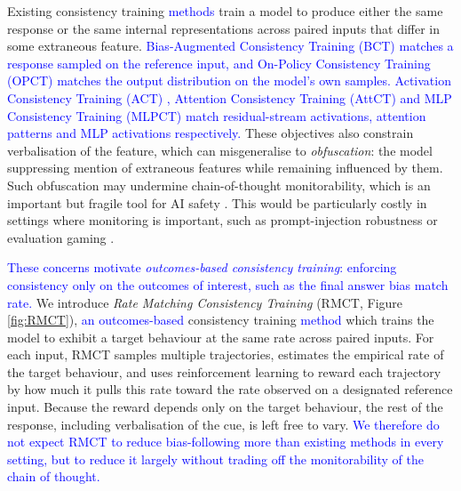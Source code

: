 \documentclass{article}
\begin{document}
Existing consistency training \textcolor{blue}{methods} train a model to produce either the same response or the same internal representations across paired inputs that differ in some extraneous feature. \textcolor{blue}{Bias-Augmented Consistency Training (BCT) \citep{chua_bias-augmented_2024} matches a response sampled on the reference input, and On-Policy Consistency Training (OPCT) \citep{han2026onpolicy} matches the output distribution on the model's own samples.} \textcolor{blue}{Activation Consistency Training (ACT) \citep{irpan_consistency_2025}, Attention Consistency Training (AttCT) and MLP Consistency Training (MLPCT) \citep{gautam2026consistency} match residual-stream activations, attention patterns and MLP activations respectively.} These objectives also constrain verbalisation of the feature, which can misgeneralise to \emph{obfuscation}: the model suppressing mention of extraneous features while remaining influenced by them. Such obfuscation may undermine chain-of-thought monitorability, which is an important but fragile tool for AI safety \citep{korbak2025chain}. This would be particularly costly in settings where monitoring is important, such as prompt-injection robustness \citep{anthropic_prompt_injection_2025} or evaluation gaming \citep{schoen_stress_2025}.

\textcolor{blue}{These concerns motivate \emph{outcomes-based consistency training}: enforcing consistency only on the outcomes of interest, such as the final answer bias match rate.} We introduce \emph{Rate Matching Consistency Training} (RMCT, Figure \ref{fig:RMCT}), \textcolor{blue}{an outcomes-based} consistency training \textcolor{blue}{method} which trains the model to exhibit a target behaviour at the same rate across paired inputs. For each input, RMCT samples multiple trajectories, estimates the empirical rate of the target behaviour, and uses reinforcement learning to reward each trajectory by how much it pulls this rate toward the rate observed on a designated reference input. Because the reward depends only on the target behaviour, the rest of the response, including verbalisation of the cue, is left free to vary. \textcolor{blue}{We therefore do not expect RMCT to reduce bias-following more than existing methods in every setting, but to reduce it largely without trading off the monitorability of the chain of thought.}
\end{document}
